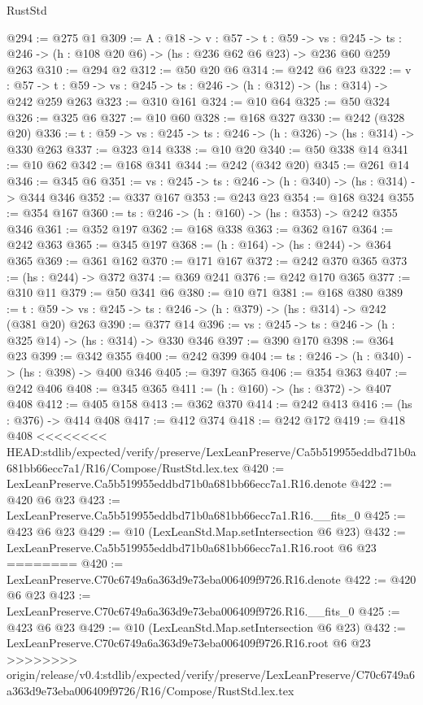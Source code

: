 \begin{lexlean}{RustStd}
\begin{coremodule}
{\begin{coremodule}
@294 := @275 @1
@309 := {A : @18} ->
  {v : @57} ->
  {t : @59} ->
  {vs : @245} -> {ts : @246} -> (h : @108 @20 @6) -> (hs : @236 @62 @6 @23) -> @236 @60 @259 @263
@310 := @294 @2
@312 := @50 @20 @6
@314 := @242 @6 @23
@322 := {v : @57} ->
  {t : @59} -> {vs : @245} -> {ts : @246} -> (h : @312) -> (hs : @314) -> @242 @259 @263
@323 := @310 @161
@324 := @10 @64
@325 := @50 @324
@326 := @325 @6
@327 := @10 @60
@328 := @168 @327
@330 := @242 (@328 @20)
@336 := {t : @59} -> {vs : @245} -> {ts : @246} -> (h : @326) -> (hs : @314) -> @330 @263
@337 := @323 @14
@338 := @10 @20
@340 := @50 @338 @14
@341 := @10 @62
@342 := @168 @341
@344 := @242 (@342 @20)
@345 := @261 @14
@346 := @345 @6
@351 := {vs : @245} -> {ts : @246} -> (h : @340) -> (hs : @314) -> @344 @346
@352 := @337 @167
@353 := @243 @23
@354 := @168 @324
@355 := @354 @167
@360 := {ts : @246} -> (h : @160) -> (hs : @353) -> @242 @355 @346
@361 := @352 @197
@362 := @168 @338
@363 := @362 @167
@364 := @242 @363
@365 := @345 @197
@368 := (h : @164) -> (hs : @244) -> @364 @365
@369 := @361 @162
@370 := @171 @167
@372 := @242 @370 @365
@373 := (hs : @244) -> @372
@374 := @369 @241
@376 := @242 @170 @365
@377 := @310 @11
@379 := @50 @341 @6
@380 := @10 @71
@381 := @168 @380
@389 := {t : @59} -> {vs : @245} -> {ts : @246} -> (h : @379) -> (hs : @314) -> @242 (@381 @20) @263
@390 := @377 @14
@396 := {vs : @245} -> {ts : @246} -> (h : @325 @14) -> (hs : @314) -> @330 @346
@397 := @390 @170
@398 := @364 @23
@399 := @342 @355
@400 := @242 @399
@404 := {ts : @246} -> (h : @340) -> (hs : @398) -> @400 @346
@405 := @397 @365
@406 := @354 @363
@407 := @242 @406
@408 := @345 @365
@411 := (h : @160) -> (hs : @372) -> @407 @408
@412 := @405 @158
@413 := @362 @370
@414 := @242 @413
@416 := (hs : @376) -> @414 @408
@417 := @412 @374
@418 := @242 @172
@419 := @418 @408
<<<<<<<< HEAD:stdlib/expected/verify/preserve/LexLeanPreserve/Ca5b519955eddbd71b0a681bb66ecc7a1/R16/Compose/RustStd.lex.tex
@420 := LexLeanPreserve.Ca5b519955eddbd71b0a681bb66ecc7a1.R16.denote
@422 := @420 @6 @23
@423 := LexLeanPreserve.Ca5b519955eddbd71b0a681bb66ecc7a1.R16.__fits_0
@425 := @423 @6 @23
@429 := @10 (LexLeanStd.Map.setIntersection @6 @23)
@432 := LexLeanPreserve.Ca5b519955eddbd71b0a681bb66ecc7a1.R16.root @6 @23
========
@420 := LexLeanPreserve.C70c6749a6a363d9e73eba006409f9726.R16.denote
@422 := @420 @6 @23
@423 := LexLeanPreserve.C70c6749a6a363d9e73eba006409f9726.R16.__fits_0
@425 := @423 @6 @23
@429 := @10 (LexLeanStd.Map.setIntersection @6 @23)
@432 := LexLeanPreserve.C70c6749a6a363d9e73eba006409f9726.R16.root @6 @23
>>>>>>>> origin/release/v0.4:stdlib/expected/verify/preserve/LexLeanPreserve/C70c6749a6a363d9e73eba006409f9726/R16/Compose/RustStd.lex.tex

\end{coremodule}}
\end{coremodule}
\end{lexlean}
